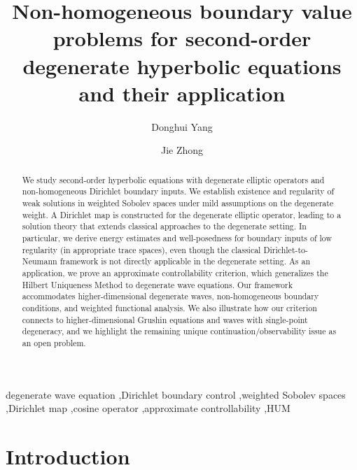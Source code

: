 \documentclass[preprint,12pt]{elsarticle}
\theoremstyle{definition}   %
\numberwithin{equation}{section}
\begin{document}
\begin{frontmatter}
\title{Non-homogeneous boundary value problems for second-order degenerate hyperbolic equations and their application}

\author[aff1]{Donghui Yang}
\author[aff2]{Jie Zhong}

\address[aff1]{School of Mathematics and Statistics, Central South University, Changsha 410075, China}
\address[aff2]{Department of Mathematics, California State University Los Angeles, Los Angeles, CA, USA}

\begin{abstract}
We study second-order hyperbolic equations with degenerate elliptic operators and non-homogeneous Dirichlet boundary inputs. We establish existence and regularity of weak solutions in weighted Sobolev spaces under mild assumptions on the degenerate weight. A Dirichlet map is constructed for the degenerate elliptic operator, leading to a solution theory that extends classical approaches to the degenerate setting. In particular, we derive energy estimates and well-posedness for boundary inputs of low regularity (in appropriate trace spaces), even though the classical Dirichlet-to-Neumann framework is not directly applicable in the degenerate setting. As an application, we prove an approximate controllability criterion, which generalizes the Hilbert Uniqueness Method to degenerate wave equations. Our framework accommodates higher-dimensional degenerate waves, non-homogeneous boundary conditions, and weighted functional analysis. We also illustrate how our criterion connects to higher-dimensional Grushin equations and waves with single-point degeneracy, and we highlight the remaining unique continuation/observability issue as an open problem.
\end{abstract}

\begin{keyword}
degenerate wave equation \sep Dirichlet boundary control \sep weighted Sobolev spaces \sep Dirichlet map \sep cosine operator \sep approximate controllability \sep HUM
\end{keyword}

\end{frontmatter}

\section{Introduction}
\end{document}
